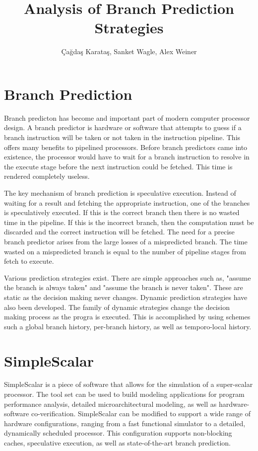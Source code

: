 \documentclass[12pt, twocolumn]{article}
\begin{document}
\author{\c{C}a\u{g}da\c{s} Karata\c{s}, Sanket Wagle, Alex Weiner}
\title{Analysis of Branch Prediction Strategies}
\maketitle

\section{Branch Prediction}
Branch predicton has become and important part of modern computer processor design. A branch predictor is hardware or software that attempts to guess if a branch instruction will be taken or not taken in the instruction pipeline. This offers many benefits to pipelined processors. Before branch predictors came into existence, the processor would have to wait for a branch instruction to resolve in the execute stage before the next instruction could be fetched. This time is rendered completely useless. 

The key mechanism of branch prediction is speculative execution. Instead of waiting for a result and fetching the appropriate instruction, one of the branches is speculatively executed. If this is the correct branch then there is no wasted time in the pipeline. If this is the incorrect branch, then the computation must be discarded and the correct instruction will be fetched. The need for a precise branch predictor arises from the large losses of a mispredicted branch. The time wasted on a mispredicted branch is equal to the number of pipeline stages from fetch to execute.

Various prediction strategies exist. There are simple approaches such as, "assume the branch is always taken" and "assume the branch is never taken". These are static as the decision making never changes. Dynamic prediction strategies have also been developed. The family of dynamic strategies change the decision making process as the progra is executed. This is accomplished by using schemes such a global branch history, per-branch history, as well as temporo-local history.

\section{SimpleScalar}
SimpleScalar is a piece of software that allows for the simulation of a super-scalar processor. The tool set can be used to build modeling applications for program performance analysis, detailed microarchitectural modeling, as well as hardware-software co-verification. SimpleScalar can be modified to support a wide range of hardware configurations, ranging from a fast functional simulator to a detailed, dynamically scheduled processor. This configuration supports non-blocking caches, speculative execution, as well as state-of-the-art branch prediction.
\end{document}
